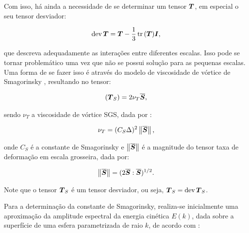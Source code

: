 Com isso, há ainda a necessidade de se determinar um tensor $\boldsymbol{T}$, em especial o seu tensor desviador:

\begin{equation}
    \mathop{\mathrm{dev}}\nolimits{\boldsymbol{T}}=\boldsymbol{T}-\frac{1}{3}\mathop{\mathrm{tr}}\nolimits{(\boldsymbol{T})}\boldsymbol{I}\text{,}
\end{equation}

\noindent que descreva adequadamente as interações entre diferentes escalas. Isso pode se tornar problemático uma vez que não se possui solução para as pequenas escalas. Uma forma de se fazer isso é através do modelo de viscosidade de vórtice de Smagorinsky \cite{smagorinsky1963general}, resultando no tensor:

\begin{equation}
    \left({\boldsymbol{T}_S}\right)=2\nu_T\overline{\boldsymbol{S}}\text{,}
\end{equation}

\noindent sendo $\nu_T$ a viscosidade de vórtice SGS, dada por \cite{germano1991dynamic,piomelli1999large,hughes2000large,bailly2015turbulence,katopodes2019free}:

\begin{equation}
    \nu_T=(C_S\Delta)^2\left\lVert{\overline{\boldsymbol{S}}}\right\lVert\text{,}
\end{equation}

\noindent onde $C_S$ é a constante de Smagorinsky e $\left\lVert{\overline{\boldsymbol{S}}}\right\lVert$ é a magnitude do tensor taxa de deformação em escala grosseira, dada por:

\begin{equation}
    \left\lVert{\overline{\boldsymbol{S}}}\right\lVert=(2\overline{\boldsymbol{S}}:\overline{\boldsymbol{S}})^{1/2}\text{.}
\end{equation}

Note que o tensor $\boldsymbol{T}_S$ é um tensor desviador, ou seja, $\boldsymbol{T}_S=\mathop{\mathrm{dev}}\nolimits{\boldsymbol{T}_S}$.

%

Para a determinação da constante de Smagorinsky, realiza-se inicialmente uma aproximação da amplitude espectral da energia cinética $E(k)$, dada sobre a superfície de uma esfera parametrizada de raio $k$, de acordo com \cite{hughes2000large}:

